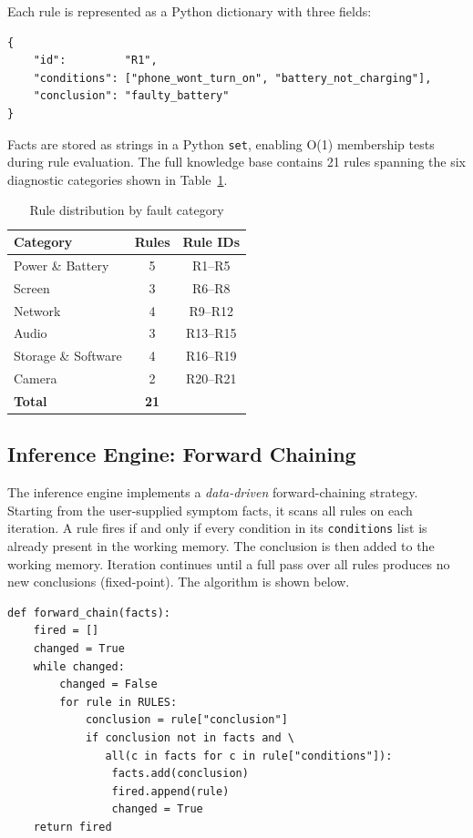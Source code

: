 \documentclass[12pt,a4paper]{article}
\begin{document}
Each rule is represented as a Python dictionary with three fields:

\begin{lstlisting}[style=pythonstyle]
{
    "id":         "R1",
    "conditions": ["phone_wont_turn_on", "battery_not_charging"],
    "conclusion": "faulty_battery"
}
\end{lstlisting}

Facts are stored as strings in a Python \texttt{set}, enabling O(1) membership
tests during rule evaluation. The full knowledge base contains 21 rules spanning
the six diagnostic categories shown in Table~\ref{tab:rules}.

\begin{table}[h]
\centering
\caption{Rule distribution by fault category}
\label{tab:rules}
\begin{tabular}{lcc}
\toprule
\textbf{Category} & \textbf{Rules} & \textbf{Rule IDs} \\
\midrule
Power \& Battery    & 5 & R1--R5   \\
Screen              & 3 & R6--R8   \\
Network             & 4 & R9--R12  \\
Audio               & 3 & R13--R15 \\
Storage \& Software & 4 & R16--R19 \\
Camera              & 2 & R20--R21 \\
\midrule
\textbf{Total}      & \textbf{21} & \\
\bottomrule
\end{tabular}
\end{table}

\subsection{Inference Engine: Forward Chaining}

The inference engine implements a \emph{data-driven} forward-chaining strategy.
Starting from the user-supplied symptom facts, it scans all rules on each iteration.
A rule fires if and only if every condition in its \texttt{conditions} list is
already present in the working memory. The conclusion is then added to the working
memory. Iteration continues until a full pass over all rules produces no new
conclusions (fixed-point). The algorithm is shown below.

\begin{lstlisting}[style=pythonstyle]
def forward_chain(facts):
    fired = []
    changed = True
    while changed:
        changed = False
        for rule in RULES:
            conclusion = rule["conclusion"]
            if conclusion not in facts and \
               all(c in facts for c in rule["conditions"]):
                facts.add(conclusion)
                fired.append(rule)
                changed = True
    return fired
\end{lstlisting}
\end{document}
